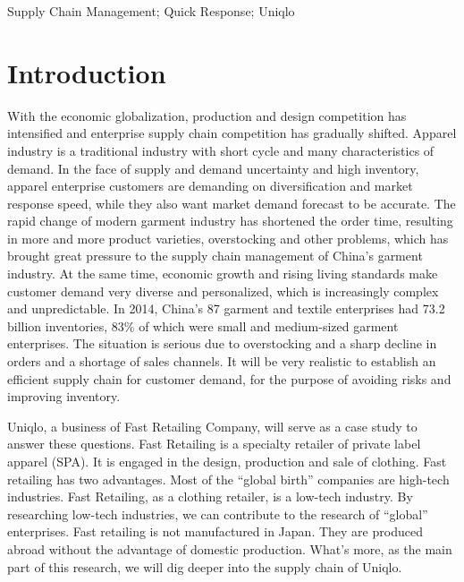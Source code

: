 \documentclass[12pt,]{article}
\begin{document}
Supply Chain Management; Quick Response; Uniqlo

\normalsize

\newpage

\tableofcontents

\newpage

\hypertarget{introduction}{%
\section{Introduction}\label{introduction}}

With the economic globalization, production and design competition has
intensified and enterprise supply chain competition has gradually
shifted. Apparel industry is a traditional industry with short cycle and
many characteristics of demand. In the face of supply and demand
uncertainty and high inventory, apparel enterprise customers are
demanding on diversification and market response speed, while they also
want market demand forecast to be accurate. The rapid change of modern
garment industry has shortened the order time, resulting in more and
more product varieties, overstocking and other problems, which has
brought great pressure to the supply chain management of China's garment
industry. At the same time, economic growth and rising living standards
make customer demand very diverse and personalized, which is
increasingly complex and unpredictable. In 2014, China's 87 garment and
textile enterprises had 73.2 billion inventories, 83\% of which were
small and medium-sized garment enterprises. The situation is serious due
to overstocking and a sharp decline in orders and a shortage of sales
channels. It will be very realistic to establish an efficient supply
chain for customer demand, for the purpose of avoiding risks and
improving inventory.

Uniqlo, a business of Fast Retailing Company, will serve as a case study
to answer these questions. Fast Retailing is a specialty retailer of
private label apparel (SPA). It is engaged in the design, production and
sale of clothing. Fast retailing has two advantages. Most of the
``global birth'' companies are high-tech industries. Fast Retailing, as
a clothing retailer, is a low-tech industry. By researching low-tech
industries, we can contribute to the research of ``global'' enterprises.
Fast retailing is not manufactured in Japan. They are produced abroad
without the advantage of domestic production. What's more, as the main
part of this research, we will dig deeper into the supply chain of
Uniqlo.
\end{document}
